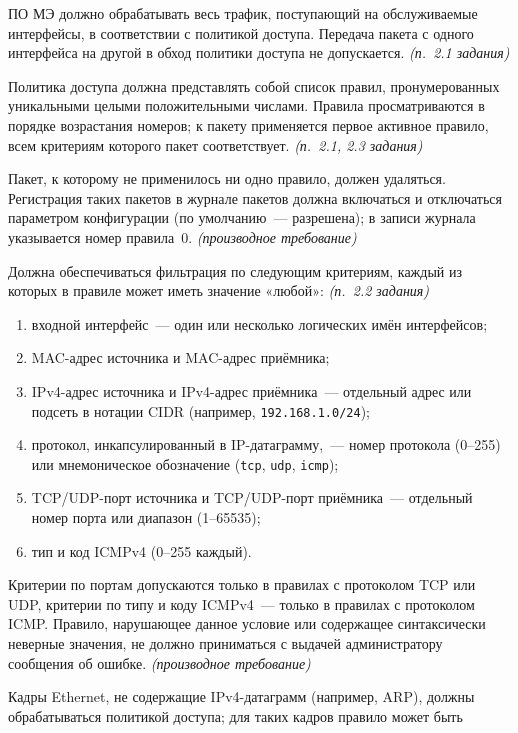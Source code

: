 \documentclass[12pt,a4paper,final]{article}
\newenvironment{reqs}
  {\begin{description}[style=sameline,leftmargin=2.2cm,labelwidth=2.0cm,
     labelsep=0.2cm,font=\normalfont\bfseries,itemsep=3pt]}
  {\end{description}}
\newcommand{\src}[1]{\textit{(п.~#1 задания)}}
\newcommand{\der}{\textit{(производное требование)}}
\begin{document}
\begin{reqs}
\item[ФЛТ-01] ПО МЭ должно обрабатывать весь трафик, поступающий на обслуживаемые
  интерфейсы, в соответствии с политикой доступа. Передача пакета с одного
  интерфейса на другой в обход политики доступа не допускается. \src{2.1}
\item[ФЛТ-02] Политика доступа должна представлять собой список правил,
  пронумерованных уникальными целыми положительными числами. Правила просматриваются
  в порядке возрастания номеров; к пакету применяется первое активное правило,
  всем критериям которого пакет соответствует. \src{2.1, 2.3}
\item[ФЛТ-03] Пакет, к которому не применилось ни одно правило, должен удаляться. Регистрация таких пакетов
  в журнале пакетов должна включаться и отключаться параметром конфигурации
  (по умолчанию~— разрешена); в записи журнала указывается номер правила~0. \der
\item[ФЛТ-04] Должна обеспечиваться фильтрация по следующим критериям, каждый
  из которых в правиле может иметь значение «любой»: \src{2.2}
  \begin{enumerate}
  \item входной интерфейс~— один или несколько логических имён интерфейсов;
  \item MAC-адрес источника и MAC-адрес приёмника;
  \item IPv4-адрес источника и IPv4-адрес приёмника~— отдельный адрес или
    подсеть в нотации CIDR (например, \texttt{192.168.1.0/24});
  \item протокол, инкапсулированный в IP-датаграмму,~— номер протокола (0--255)
    или мнемоническое обозначение (\texttt{tcp}, \texttt{udp}, \texttt{icmp});
  \item TCP/UDP-порт источника и TCP/UDP-порт приёмника~— отдельный номер порта
    или диапазон (1--65535);
  \item тип и код ICMPv4 (0--255 каждый).
  \end{enumerate}
\item[ФЛТ-05] Критерии по портам допускаются только в правилах с протоколом
  TCP или UDP, критерии по типу и коду ICMPv4~— только в правилах с протоколом ICMP.
  Правило, нарушающее данное условие или содержащее синтаксически неверные
  значения, не должно приниматься с выдачей администратору сообщения об ошибке. \der
\item[ФЛТ-06] Кадры Ethernet, не содержащие IPv4-датаграмм (например, ARP),
  должны обрабатываться политикой доступа; для таких кадров правило может быть

\end{reqs}
\end{document}
